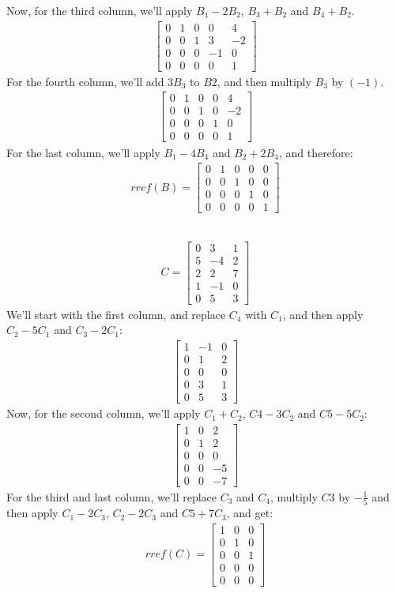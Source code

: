 \documentclass[a4paper, 12pt]{article}
\newcommand{\sub}[1]{\subsection{\underline{#1}}}
\newcommand{\?}{\stackrel{?}{=}}
\newcommand{\eq}[1]{\begin{align*}#1\end{align*}}
\begin{document}
Now, for the third column, we'll apply $B_1-2B_2$, $B_3+B_2$ and $B_4+B_2$.
\eq{\begin{bmatrix}
    0&1&0&0&4\\
    0&0&1&3&-2\\
    0&0&0&-1&0\\
    0&0&0&0&1
\end{bmatrix}}
For the fourth column, we'll add $3B_3$ to $B2$, and then multiply $B_3$ by $(-1)$.
\eq{\begin{bmatrix}
    0&1&0&0&4\\
    0&0&1&0&-2\\
    0&0&0&1&0\\
    0&0&0&0&1
\end{bmatrix}}
For the last column, we'll apply $B_1-4B_4$ and $B_2+2B_4$, and therefore:
\eq{rref(B)=\begin{bmatrix}
    0&1&0&0&0\\
    0&0&1&0&0\\
    0&0&0&1&0\\
    0&0&0&0&1
\end{bmatrix}}
\sub{}
\eq{C=\begin{bmatrix}
    0&3&1\\
    5&-4&2\\
    2&2&7\\
    1&-1&0\\
    0&5&3
\end{bmatrix}}
We'll start with the first column, and replace $C_4$ with $C_1$, and then apply $C_2-5C_1$ and $C_3-2C_1$:
\eq{\begin{bmatrix}
    1&-1&0\\
    0&1&2\\
    0&0&0\\
    0&3&1\\
    0&5&3
\end{bmatrix}}
Now, for the second column, we'll apply $C_1+C_2$, $C4-3C_2$ and $C5-5C_2$:
\eq{\begin{bmatrix}
    1&0&2\\
    0&1&2\\
    0&0&0\\
    0&0&-5\\
    0&0&-7
\end{bmatrix}}
For the third and last column, we'll replace $C_3$ and $C_4$, multiply $C3$ by $-\frac{1}{5}$ and then apply $C_1-2C_3$, $C_2-2C_3$ and $C5+7C_3$, and get:
\eq{rref(C)=\begin{bmatrix}
    1&0&0\\
    0&1&0\\
    0&0&1\\
    0&0&0\\
    0&0&0
\end{bmatrix}}
\pagebreak
\end{document}

